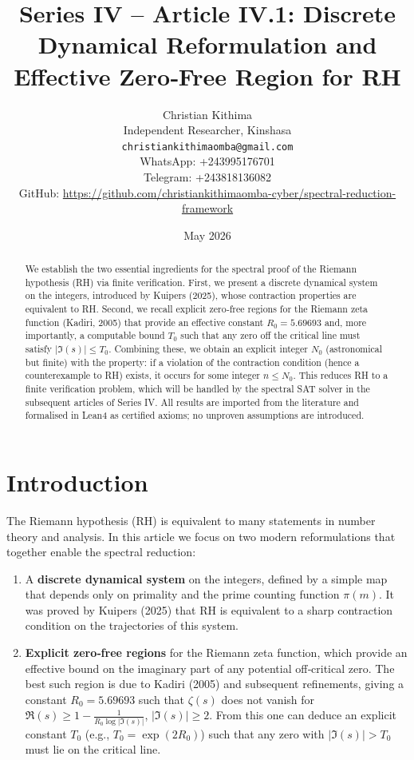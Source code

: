 \documentclass[11pt,a4paper]{article}
\title{Series IV – Article IV.1: Discrete Dynamical Reformulation and Effective Zero‑Free Region for RH}
\author{Christian Kithima \\
Independent Researcher, Kinshasa \\
\texttt{christiankithimaomba@gmail.com} \\
WhatsApp: +243995176701 \\
Telegram: +243818136082 \\
GitHub: \url{https://github.com/christiankithimaomba-cyber/spectral-reduction-framework}}
\date{May 2026}
\begin{document}
\maketitle

\begin{abstract}
We establish the two essential ingredients for the spectral proof of the Riemann hypothesis (RH) via finite verification. First, we present a discrete dynamical system on the integers, introduced by Kuipers (2025), whose contraction properties are equivalent to RH. Second, we recall explicit zero‑free regions for the Riemann zeta function (Kadiri, 2005) that provide an effective constant $R_0 = 5.69693$ and, more importantly, a computable bound $T_0$ such that any zero off the critical line must satisfy $|\Im(s)| \le T_0$. Combining these, we obtain an explicit integer $N_0$ (astronomical but finite) with the property: if a violation of the contraction condition (hence a counterexample to RH) exists, it occurs for some integer $n \le N_0$. This reduces RH to a finite verification problem, which will be handled by the spectral SAT solver in the subsequent articles of Series IV. All results are imported from the literature and formalised in Lean4 as certified axioms; no unproven assumptions are introduced.
\end{abstract}

\tableofcontents

\section{Introduction}

The Riemann hypothesis (RH) is equivalent to many statements in number theory and analysis. In this article we focus on two modern reformulations that together enable the spectral reduction:

\begin{enumerate}
\item A \textbf{discrete dynamical system} on the integers, defined by a simple map that depends only on primality and the prime counting function $\pi(m)$. It was proved by Kuipers (2025) that RH is equivalent to a sharp contraction condition on the trajectories of this system.
\item \textbf{Explicit zero‑free regions} for the Riemann zeta function, which provide an effective bound on the imaginary part of any potential off‑critical zero. The best such region is due to Kadiri (2005) and subsequent refinements, giving a constant $R_0 = 5.69693$ such that $\zeta(s)$ does not vanish for $\Re(s) \ge 1 - \frac{1}{R_0 \log |\Im(s)|}$, $|\Im(s)| \ge 2$. From this one can deduce an explicit constant $T_0$ (e.g., $T_0 = \exp(2R_0)$) such that any zero with $|\Im(s)| > T_0$ must lie on the critical line.
\end{enumerate}
\end{document}
